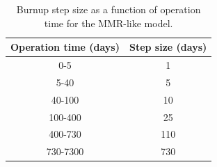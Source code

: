 \begin{table}
    \centering 
    \caption{Burnup step size as a function of operation time for the 
    MMR-like model.}
    \label{tab:bu_sizes}
    \begin{tabular}{c c}
        \hline
        Operation time (days) & Step size (days) \\
        \hline 
        0-5 & 1 \\
        5-40 & 5 \\
        40-100 & 10 \\
        100-400 & 25 \\
        400-730 & 110 \\
        730-7300 & 730 \\
        \hline
    \end{tabular}
\end{table}

